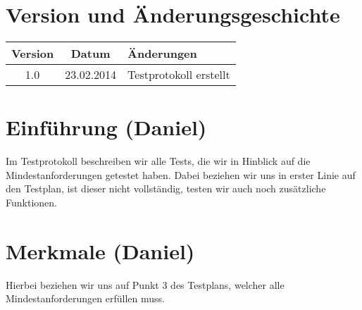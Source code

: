 \documentclass[fontsize=12pt,paper=a4,twoside]{scrartcl}
\begin{document}
\section*{Version und Änderungsgeschichte}

\begin{tabular}{ccl}
Version & Datum & Änderungen \\
\hline
1.0 & 23.02.2014 & Testprotokoll erstellt \\
\end{tabular}


\section{Einführung (Daniel)}

Im Testprotokoll beschreiben wir alle Tests, die wir in Hinblick auf die Mindestanforderungen getestet haben. Dabei beziehen wir uns in erster Linie auf den Testplan, ist dieser nicht vollständig, testen wir auch noch zusätzliche Funktionen.\\


\section{Merkmale (Daniel)}

Hierbei beziehen wir uns auf Punkt 3 des Testplans, welcher alle Mindestanforderungen erfüllen muss. 
\end{document}
